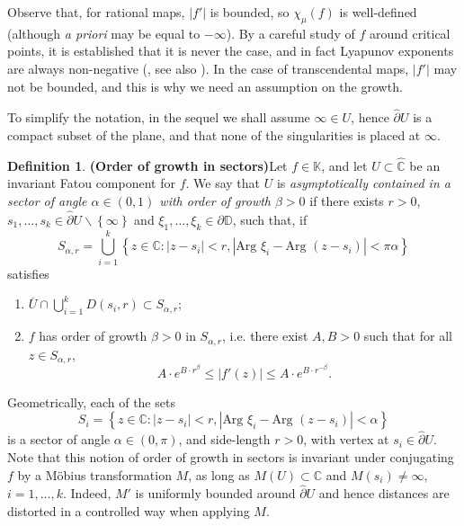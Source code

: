 \documentclass[11pt]{article}
\theoremstyle{definition}
\newtheorem{defi}[thm]{Definition}
\theoremstyle{remark}
\theoremstyle{plain}
\begin{document}
Observe that, for rational maps, $ \left| f'\right|  $ is bounded, so $ \chi_\mu (f) $ is well-defined (although \textit{a priori} may be equal to $ -\infty $). By a careful study of $ f $ around critical points, it is established that it is never the case, and in fact Lyapunov exponents are always non-negative (\cite{Przytycki-Lyapunovexponents}, see also \cite[Sect. 28.1]{UrbanskiRoyMunday3}). In the case of transcendental maps, $ \left| f'\right|  $ may not be bounded, and this is why we need an assumption on the growth.


To simplify the notation, in the sequel we shall assume $ \infty\in U $, hence $ \widehat{\partial}U $ is a compact subset of the plane, and that none of the singularities is placed at $ \infty $. 
\begin{defi}{\bf (Order of growth in sectors)}\label{defi-sectorS}
	Let $ f\in\mathbb{K} $, and let $ U\subset \widehat{\mathbb{C}} $ be an invariant Fatou component for $ f $. We say that $ U $ is {\em asymptotically contained in a sector of angle $ \alpha\in   \left( 0, 1\right)  $ with order of growth $ \beta >0 $} if there exists $ r>0 $, $ s_1, \dots, s_k\in\widehat{\partial} U \smallsetminus\left\lbrace \infty\right\rbrace $ and $ \xi_1, \dots, \xi_k\in\partial\mathbb{D} $, such that, if
	\[ S_{\alpha, r}=\bigcup\limits_{i=1}^k\left\lbrace z\in{\mathbb{C}} \colon \left| z-s_i\right| <r, \left|\textrm{Arg }\xi_i-\textrm{Arg }(z-s_i )\right| <\pi\alpha\right\rbrace \]satisfies
	\begin{enumerate}[label={(\alph*)}]
		\item $ \overline U \cap \bigcup\limits_{i=1}^k D(s_i, r) \subset S_{\alpha, r} $;
		\item $ f $ has order of growth $ \beta>0 $ in $  S_{\alpha, r} $, i.e. there exist $ A,B>0 $ such that for all $ z\in S_{\alpha, r}$,  \[A \cdot e^{B\cdot r^{\beta}}\leq \left| f'(z)\right| \leq A \cdot e^{B\cdot r^{-\beta}}.\]
	\end{enumerate}
\end{defi}

Geometrically, each of the sets 
\[ S_{i}=\left\lbrace z\in{\mathbb{C}} \colon \left| z-s_i\right| <r, \left|\textrm{Arg }\xi_i-\textrm{Arg }(z-s_i )\right| <\alpha\right\rbrace \] is a sector of angle $ \alpha \in (0,\pi)$, and side-length $ r>0 $, with vertex at $ s_i\in\widehat{\partial}U $.
Note that this notion of order of growth in sectors is invariant under conjugating $ f $ by a Möbius transformation $ M $, as long as $ M(U)\subset\mathbb{C} $ and $ M(s_i)\neq \infty $, $ i=1,\dots, k $. Indeed, $ M' $ is uniformly bounded around $ \widehat{\partial} U$ and hence distances are distorted in a controlled way when applying $ M $.
\end{document}
